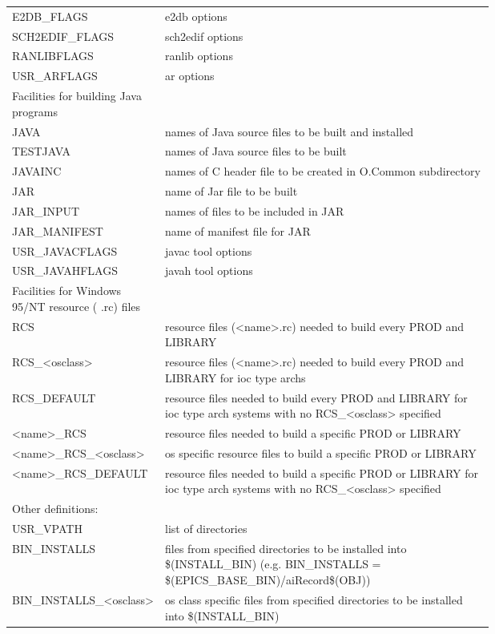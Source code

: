 \begin{center}
\begin{longtable}{lp{0.7\linewidth}}
E2DB\_FLAGS & e2db options\\
SCH2EDIF\_FLAGS & sch2edif options\\
RANLIBFLAGS & ranlib options\\
USR\_ARFLAGS & ar options\\
Facilities for building Java programs &    \\
JAVA & names of Java source files to be built and installed\\
TESTJAVA & names of Java source files to be built\\
JAVAINC & names of C header file to be created in O.Common subdirectory\\
JAR & name of Jar file to be built\\
JAR\_INPUT & names of files to be included in JAR\\
JAR\_MANIFEST & name of manifest file for JAR\\
USR\_JAVACFLAGS & javac tool options\\
USR\_JAVAHFLAGS & javah tool options\\
Facilities for Windows 95/NT resource ( .rc) files &    \\
RCS & resource files (\textless{}name\textgreater{}.rc) needed to build every PROD and LIBRARY\\
RCS\_\textless{}osclass\textgreater{} & resource files (\textless{}name\textgreater{}.rc) needed to build every PROD and LIBRARY for ioc type archs\\
RCS\_DEFAULT & resource files needed to build every PROD and LIBRARY for ioc type arch systems with no RCS\_\textless{}osclass\textgreater{} specified\\
\textless{}name\textgreater{}\_RCS & resource files needed to build a specific PROD or LIBRARY\\
\textless{}name\textgreater{}\_RCS\_\textless{}osclass\textgreater{} & os specific resource files to build a specific PROD or LIBRARY\\
\textless{}name\textgreater{}\_RCS\_DEFAULT & resource files needed to build a specific PROD or LIBRARY for ioc type arch systems with no RCS\_\textless{}osclass\textgreater{} specified\\
Other definitions:  &    \\
USR\_VPATH & list of directories\\
BIN\_INSTALLS & files from specified directories to be installed into \$(INSTALL\_BIN) (e.g. BIN\_INSTALLS = \$(EPICS\_BASE\_BIN)/aiRecord\$(OBJ))\\
BIN\_INSTALLS\_\textless{}osclass\textgreater{} & os class specific files from specified directories to be installed into \$(INSTALL\_BIN)\\

\end{longtable}
\end{center}
